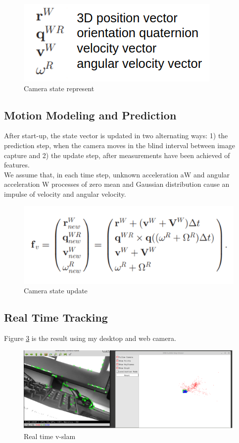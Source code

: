 \documentclass[10pt, conference, compsocconf]{IEEEtran}
\begin{document}
\begin{figure}[H]
	\centering
	\includegraphics[scale = 0.50]{image/states.png}
	\caption{Camera state represent}
	\label{fig:states}
\end{figure}
\subsection{Motion Modeling and Prediction} 
After start-up, the state vector is updated in two alternating ways: 1) the prediction step, when the camera moves in the blind interval between image capture and 2) the update step, after measurements have been achieved of features.\\
We assume that, in each time step, unknown acceleration aW and angular acceleration W processes of zero mean and Gaussian distribution cause an impulse of velocity and angular velocity.  
\begin{figure}[h]
	\centering
	\includegraphics[scale = 0.50]{image/stateupdate.png}
	\caption{Camera state update}
	\label{fig:stateupdate}
\end{figure}
\subsection{Real Time Tracking} 
Figure \ref{fig:slam} is the result using my desktop and web camera. 
\begin{figure}[h]
	\centering
	\includegraphics[scale = 0.40]{image/slam.png}
	\caption{Real time v-slam}
	\label{fig:slam}
\end{figure}
\end{document}
